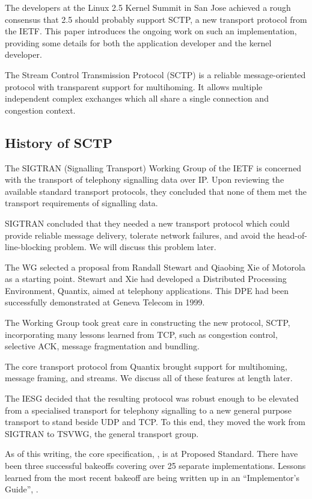 \documentclass[twocolumn]{article}
\begin{document}
The developers at the Linux 2.5 Kernel Summit in San Jose achieved a
rough consensus that 2.5 should probably support SCTP, a new transport 
protocol from the IETF.  This paper introduces the ongoing work on
such an implementation, providing some details for both the
application developer and the kernel developer.

The Stream Control Transmission Protocol (SCTP) is a reliable
message-oriented protocol with transparent support for multihoming.
It allows multiple independent complex exchanges which all share a
single connection and congestion context.

\subsection{History of SCTP}
The SIGTRAN (Signalling Transport) Working Group of the IETF is
concerned with the transport of telephony signalling data over IP.
Upon reviewing the available standard transport protocols, they
concluded that none of them met the transport requirements of
signalling data.

SIGTRAN concluded that they needed a new transport protocol which
could provide reliable message delivery, tolerate network failures,
and avoid the head-of-line-blocking problem.  We will discuss this
problem later.

The WG selected a proposal from Randall Stewart and Qiaobing Xie of
Motorola as a starting point.  Stewart and Xie had developed a
Distributed Processing Environment, Quantix, aimed at telephony
applications.  This DPE had been successfully demonstrated at Geneva
Telecom in 1999.

The Working Group took great care in constructing the new protocol,
SCTP, incorporating many lessons learned from TCP, such as congestion
control, selective ACK, message fragmentation and bundling.

The core transport protocol from Quantix brought support for
multihoming, message framing, and streams.  We discuss all of these
features at length later.

The IESG decided that the resulting protocol was robust enough to be
elevated from a specialised transport for telephony signalling to a new
general purpose transport to stand beside UDP and TCP.  To this end,
they moved the work from SIGTRAN to TSVWG, the general transport
group.

As of this writing, the core specification, \cite{rfc2960}, is at Proposed
Standard.  There have been three successful bakeoffs covering over 25
separate implementations.  Lessons learned from the most recent
bakeoff are being written up in an ``Implementor's Guide'', \cite{impl}.
\end{document}
